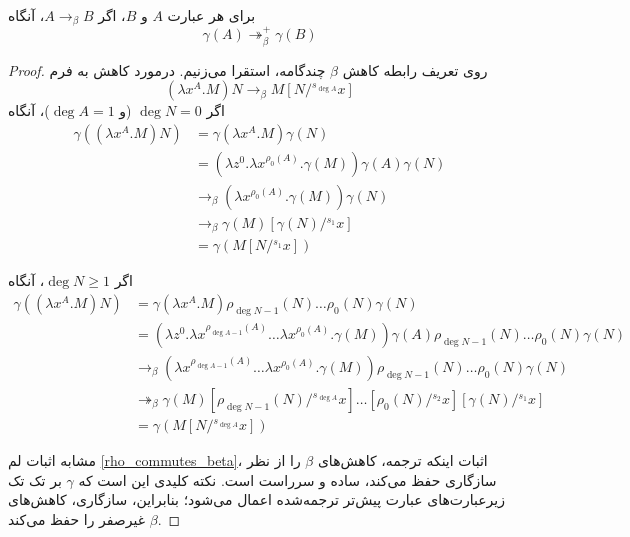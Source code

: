 \begin{lmm}\label{preserve_reduction}
برای هر عبارت
$A$ و $B$، اگر $A \to_\beta B$، آنگاه
\begin{equation*}
\gamma(A) \twoheadrightarrow^+_\beta \gamma(B)
\end{equation*}
\end{lmm}

\begin{proof}
روی تعریف رابطه کاهش
$\beta$
چندگامه، استقرا می‌زنیم. درمورد کاهش به فرم
\begin{equation*}
(\lambda x^A.M)N \rightarrow_{\beta} M[N/{}^{s_{\operatorname{deg} A}} x]
\end{equation*}
اگر
$\operatorname{deg} N = 0$ (و $\operatorname{deg} A = 1$)،
آنگاه
\begin{align*}
\gamma((\lambda x^A.M)N)
&= \gamma(\lambda x^A.M) \gamma(N) \\
&= (\lambda z^0.\lambda x^{\rho_0(A)}.\gamma(M)) \gamma(A) \gamma(N) \\
&\rightarrow_{\beta} (\lambda x^{\rho_0(A)}.\gamma(M)) \gamma(N) \\
&\rightarrow_{\beta} \gamma(M)[\gamma(N)/{}^{s_1}x] \\
&= \gamma(M[N/{}^{s_1}x])
\end{align*}

اگر
$\operatorname{deg} N \ge 1$،
آنگاه
\begin{align*}
\gamma((\lambda x^A.M)N)
&= \gamma(\lambda x^A.M) \rho_{\operatorname{deg} N - 1}(N) \dots \rho_{0}(N) \gamma(N) \\
&= (\lambda z^0.\lambda x^{\rho_{\operatorname{deg} A - 1}(A)} \dots \lambda x^{\rho_{0}(A)}.\gamma(M)) \gamma(A) \rho_{\operatorname{deg} N - 1}(N) \dots \rho_{0}(N) \gamma(N) \\
&\rightarrow_{\beta} (\lambda x^{\rho_{\operatorname{deg} A - 1}(A)} \dots \lambda x^{\rho_{0}(A)}.\gamma(M)) \rho_{\operatorname{deg} N - 1}(N) \dots \rho_{0}(N) \gamma(N) \\
&\twoheadrightarrow_{\beta} \gamma(M) [\rho_{\operatorname{deg} N - 1}(N)/{}^{s_{\operatorname{deg} A}}x] \dots [\rho_{0}(N)/{}^{s_{2}}x] [\gamma(N)/{}^{s_{1}}x] \\
&= \gamma(M[N/{}^{s_{\operatorname{deg} A}}x])
\end{align*}

مشابه اثبات لم
\ref{rho_commutes_beta}،
اثبات اینکه ترجمه، کاهش‌های
$\beta$
را از نظر سازگاری حفظ می‌کند، ساده و سرراست است. نکته کلیدی این است که
$\gamma$
بر تک تک زیرعبارت‌های عبارت پیش‌تر ترجمه‌شده اعمال می‌شود؛ بنابراین، سازگاری، کاهش‌های
$\beta$
غیرصفر را حفظ می‌کند.

\end{proof}

